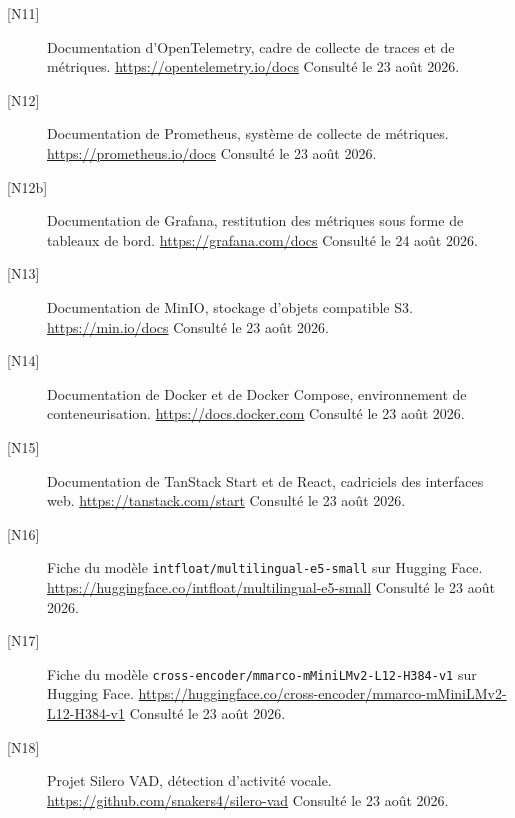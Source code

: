 \begin{description}
\item[{[N11]}] Documentation d'OpenTelemetry, cadre de collecte de traces et de métriques.
\url{https://opentelemetry.io/docs} \newline Consulté le 23 août 2026.

\item[{[N12]}] Documentation de Prometheus, système de collecte de métriques.
\url{https://prometheus.io/docs} \newline Consulté le 23 août 2026.

\item[{[N12b]}] Documentation de Grafana, restitution des métriques sous forme de
tableaux de bord. \url{https://grafana.com/docs} \newline Consulté le 24 août 2026.

\item[{[N13]}] Documentation de MinIO, stockage d'objets compatible S3.
\url{https://min.io/docs} \newline Consulté le 23 août 2026.

\item[{[N14]}] Documentation de Docker et de Docker Compose, environnement de conteneurisation.
\url{https://docs.docker.com} \newline Consulté le 23 août 2026.

\item[{[N15]}] Documentation de TanStack Start et de React, cadriciels des interfaces web.
\url{https://tanstack.com/start} \newline Consulté le 23 août 2026.

\item[{[N16]}] Fiche du modèle \texttt{intfloat/multilingual-e5-small} sur Hugging Face.
\url{https://huggingface.co/intfloat/multilingual-e5-small} \newline Consulté le 23 août 2026.

\item[{[N17]}] Fiche du modèle \texttt{cross-encoder/mmarco-mMiniLMv2-L12-H384-v1} sur
Hugging Face. \url{https://huggingface.co/cross-encoder/mmarco-mMiniLMv2-L12-H384-v1}
\newline Consulté le 23 août 2026.

\item[{[N18]}] Projet Silero VAD, détection d'activité vocale.
\url{https://github.com/snakers4/silero-vad} \newline Consulté le 23 août 2026.

\end{description}
